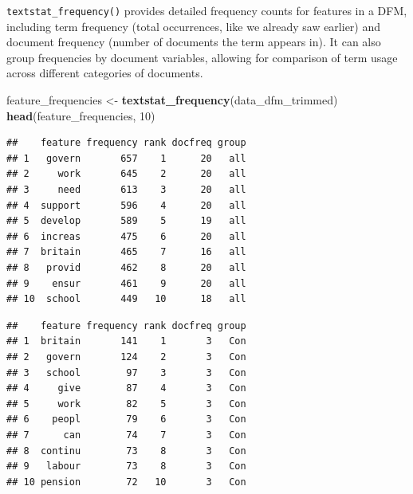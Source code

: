 \documentclass[
]{book}
\newenvironment{Shaded}{\begin{snugshade}}{\end{snugshade}}
\newcommand{\AttributeTok}[1]{\textcolor[rgb]{0.13,0.29,0.53}{#1}}
\newcommand{\CommentTok}[1]{\textcolor[rgb]{0.56,0.35,0.01}{\textit{#1}}}
\newcommand{\DecValTok}[1]{\textcolor[rgb]{0.00,0.00,0.81}{#1}}
\newcommand{\FunctionTok}[1]{\textcolor[rgb]{0.13,0.29,0.53}{\textbf{#1}}}
\newcommand{\NormalTok}[1]{#1}
\newcommand{\OtherTok}[1]{\textcolor[rgb]{0.56,0.35,0.01}{#1}}
\newcommand{\SpecialCharTok}[1]{\textcolor[rgb]{0.81,0.36,0.00}{\textbf{#1}}}
\begin{document}
\texttt{textstat\_frequency()} provides detailed frequency counts for features in a DFM, including term frequency (total occurrences, like we already saw earlier) and document frequency (number of documents the term appears in). It can also group frequencies by document variables, allowing for comparison of term usage across different categories of documents.

\begin{Shaded}
\begin{Highlighting}[]
\NormalTok{feature\_frequencies }\OtherTok{\textless{}{-}} \FunctionTok{textstat\_frequency}\NormalTok{(data\_dfm\_trimmed)}
\FunctionTok{head}\NormalTok{(feature\_frequencies, }\DecValTok{10}\NormalTok{)}
\end{Highlighting}
\end{Shaded}

\begin{verbatim}
##    feature frequency rank docfreq group
## 1   govern       657    1      20   all
## 2     work       645    2      20   all
## 3     need       613    3      20   all
## 4  support       596    4      20   all
## 5  develop       589    5      19   all
## 6  increas       475    6      20   all
## 7  britain       465    7      16   all
## 8   provid       462    8      20   all
## 9    ensur       461    9      20   all
## 10  school       449   10      18   all
\end{verbatim}

\begin{Shaded}
\end{Shaded}

\begin{verbatim}
##    feature frequency rank docfreq group
## 1  britain       141    1       3   Con
## 2   govern       124    2       3   Con
## 3   school        97    3       3   Con
## 4     give        87    4       3   Con
## 5     work        82    5       3   Con
## 6    peopl        79    6       3   Con
## 7      can        74    7       3   Con
## 8  continu        73    8       3   Con
## 9   labour        73    8       3   Con
## 10 pension        72   10       3   Con
\end{verbatim}
\end{document}
